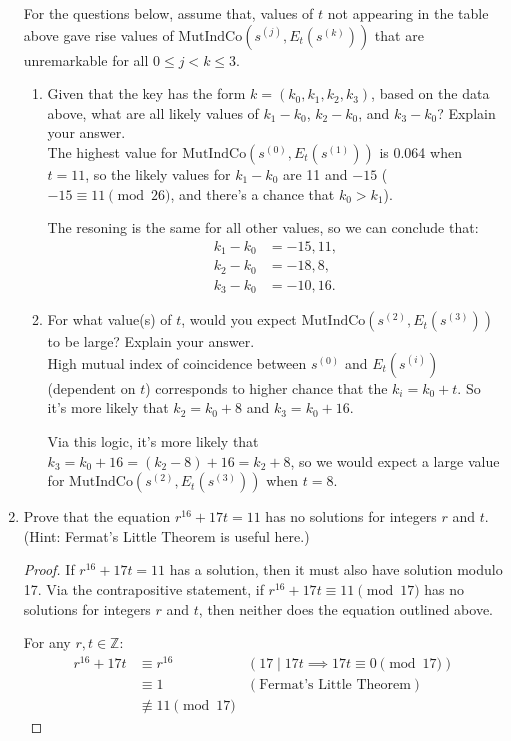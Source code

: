 \documentclass[12pt]{article}
\newcommand{\Z}{\mathbb{Z}}
\newcommand{\n}{\vspace{0.3cm}}
\begin{document}
\begin{enumerate}
For the questions below, assume that,  values of $t$ not appearing in the table above gave rise values of $\mathrm{MutIndCo}(s^{(j)},E_t(s^{(k)}))$ that are unremarkable for all $0 \leq j<k \leq 3$.
\begin{enumerate}
\item Given that the key has the form $k = (k_0, k_1, k_2,k_3)$, based on the data above, what are all likely values of $k_1-k_0$, $k_2-k_0$, and $k_3-k_0$? Explain your answer. \n\\
  The highest value for \(\mathrm{MutIndCo}(s^{(0)},E_t(s^{{(1)}}))\) is 0.064 when \(t=11\), so the likely values for \(k_1-k_0\) are 11 and \(-15\) (\(-15 \equiv 11 \pmod{26}\), and there's a chance that \(k_0 > k_1\)). \n

  The resoning is the same for all other values, so we can conclude that:
  \begin{align*}
    k_1 - k_0 &= -15,11, \\
    k_2 - k_0 &= -18,8, \\
    k_3 - k_0 &= -10,16.
  \end{align*}

\item  For what value(s) of $t$, would you expect $\mathrm{MutIndCo}(s^{(2)},E_t(s^{(3)}))$ to be large? Explain your answer. \n\\
  High mutual index of coincidence between \(s^{(0)}\) and \(E_t(s^{{(i)}})\) (dependent on \(t\)) corresponds to higher chance that the \(k_i = k_0 + t\).  So it's more likely that \(k_2 = k_0 + 8\) and \(k_3 = k_0 + 16\). \n

  Via this logic, it's more likely that \(k_3 = k_0 + 16 = (k_2 - 8) + 16 = k_2 + 8\), so we would expect a large value for \(\mathrm{MutIndCo}(s^{(2)},E_t(s^{(3)}))\) when \(t=8\).
\end{enumerate} \n

\item Prove that the equation $r^{16}+17t=11$ has no solutions for integers $r$ and $t$.  (Hint: Fermat's Little Theorem is useful here.)
  \begin{proof}
    If \(r^{16} + 17t = 11\) has a solution, then it must also have solution modulo 17.  Via the contrapositive statement, if \(r^{16} + 17t \equiv 11 \pmod{17}\) has no solutions for integers \(r\) and \(t\), then neither does the equation outlined above.

    For any \(r,t \in \Z\):
    \begin{align*}
      r^{16} + 17t &\equiv r^{16} & (17 \mid 17t \implies 17t \equiv 0 \pmod{17}) \\
                   &\equiv 1 & (\text{Fermat's Little Theorem}) \\
                   &\not\equiv 11 \pmod{17}
    \end{align*}
  \end{proof}
  


\end{enumerate}
\end{document}
